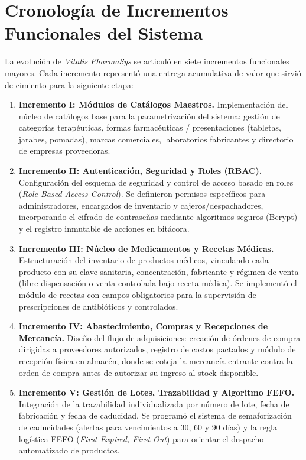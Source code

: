 \section{Cronología de Incrementos Funcionales del Sistema}

La evolución de \textit{Vitalis PharmaSys} se articuló en siete incrementos funcionales mayores. Cada incremento representó una entrega acumulativa de valor que sirvió de cimiento para la siguiente etapa:

\begin{enumerate}
    \item \textbf{Incremento I: Módulos de Catálogos Maestros.}
    Implementación del núcleo de catálogos base para la parametrización del sistema: gestión de categorías terapéuticas, formas farmacéuticas / presentaciones (tabletas, jarabes, pomadas), marcas comerciales, laboratorios fabricantes y directorio de empresas proveedoras.
    
    \item \textbf{Incremento II: Autenticación, Seguridad y Roles (RBAC).}
    Configuración del esquema de seguridad y control de acceso basado en roles (\textit{Role-Based Access Control}). Se definieron permisos específicos para administradores, encargados de inventario y cajeros/despachadores, incorporando el cifrado de contraseñas mediante algoritmos seguros (Bcrypt) y el registro inmutable de acciones en bitácora.
    
    \item \textbf{Incremento III: Núcleo de Medicamentos y Recetas Médicas.}
    Estructuración del inventario de productos médicos, vinculando cada producto con su clave sanitaria, concentración, fabricante y régimen de venta (libre dispensación o venta controlada bajo receta médica). Se implementó el módulo de recetas con campos obligatorios para la supervisión de prescripciones de antibióticos y controlados.
    
    \item \textbf{Incremento IV: Abastecimiento, Compras y Recepciones de Mercancía.}
    Diseño del flujo de adquisiciones: creación de órdenes de compra dirigidas a proveedores autorizados, registro de costos pactados y módulo de recepción física en almacén, donde se coteja la mercancía entrante contra la orden de compra antes de autorizar su ingreso al stock disponible.
    
    \item \textbf{Incremento V: Gestión de Lotes, Trazabilidad y Algoritmo FEFO.}
    Integración de la trazabilidad individualizada por número de lote, fecha de fabricación y fecha de caducidad. Se programó el sistema de semaforización de caducidades (alertas para vencimientos a 30, 60 y 90 días) y la regla logística FEFO (\textit{First Expired, First Out}) para orientar el despacho automatizado de productos.
    

\end{enumerate}
